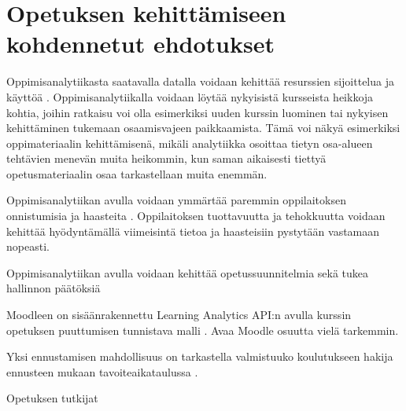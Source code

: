 \section{Opetuksen kehittämiseen kohdennetut ehdotukset}

\color{blue}
Oppimisanalytiikasta saatavalla datalla voidaan kehittää resurssien sijoittelua ja käyttöä \citep{longPenetratingFogAnalytics2011}. Oppimisanalytiikalla voidaan löytää nykyisistä kursseista heikkoja kohtia, joihin ratkaisu voi olla esimerkiksi uuden kurssin luominen tai nykyisen kehittäminen tukemaan osaamisvajeen paikkaamista. Tämä voi näkyä esimerkiksi oppimateriaalin kehittämisenä, mikäli analytiikka osoittaa tietyn osa-alueen tehtävien menevän muita heikommin, kun saman aikaisesti tiettyä opetusmateriaalin osaa tarkastellaan muita enemmän.

Oppimisanalytiikan avulla voidaan ymmärtää paremmin oppilaitoksen onnistumisia ja haasteita \citep{longPenetratingFogAnalytics2011}. Oppilaitoksen tuottavuutta ja tehokkuutta voidaan kehittää hyödyntämällä viimeisintä tietoa ja haasteisiin pystytään vastamaan nopeasti.

Oppimisanalytiikan avulla voidaan kehittää opetussuunnitelmia sekä tukea hallinnon päätöksiä \citep{romeroEducationalDataMining2010,longPenetratingFogAnalytics2011}

Moodleen on sisäänrakennettu Learning Analytics API:n avulla kurssin opetuksen puuttumisen tunnistava malli \citep{monllaoAnalyticsAPIMoodleDocs2021}. \color{red} Avaa Moodle osuutta vielä tarkemmin. \color{black}

Yksi ennustamisen mahdollisuus on tarkastella valmistuuko koulutukseen hakija ennusteen mukaan tavoiteaikataulussa \citep{barberCourseCorrectionUsing2012a}.

Opetuksen tutkijat \citep{romeroEducationalDataMining2010}
